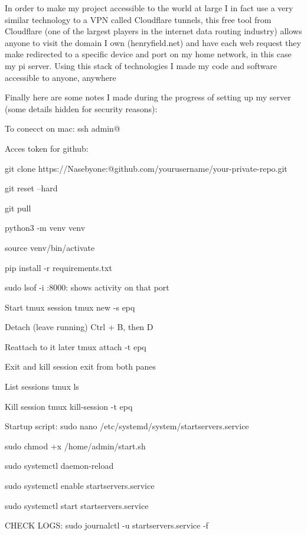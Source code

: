 In order to make my project accessible to the world at large I in fact use a very similar technology to a VPN called Cloudflare tunnels, this free tool from Cloudflare (one of the largest players in the internet data routing industry) allows anyone to visit the domain I own (henryfield.net) and have each web request they make redirected to a specific device and port on my home network, in this case my pi server. Using this stack of technologies I made my code and software accessible to anyone, anywhere

Finally here are some notes I made during the progress of setting up my server (some details hidden for security reasons):

To conecct on mac: ssh admin@

Acces token for github: 

git clone https://Nasebyone:@github.com/yourusername/your-private-repo.git

git reset --hard

git pull

python3 -m venv venv

source venv/bin/activate

pip install -r requirements.txt

sudo lsof -i :8000: shows activity on that port

Start tmux session	tmux new -s epq

Detach (leave running)	Ctrl + B, then D

Reattach to it later	tmux attach -t epq

Exit and kill session	exit from both panes

List sessions	tmux ls

Kill session	tmux kill-session -t epq

Startup script: sudo nano /etc/systemd/system/startservers.service

sudo chmod +x /home/admin/start.sh

sudo systemctl daemon-reload

sudo systemctl enable startservers.service

sudo systemctl start startservers.service

CHECK LOGS: sudo journalctl -u startservers.service -f 
